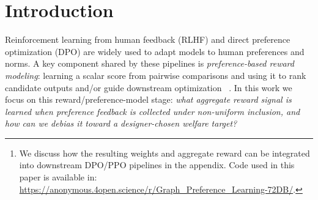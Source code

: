 \documentclass{article}
\theoremstyle{plain}
\theoremstyle{definition}
\theoremstyle{remark}
\begin{document}
\printAffiliationsAndNotice{}  %

\begin{abstract}
Preference-based reward modeling is a core component of RLHF and DPO pipelines.
In practice, the humans providing preference feedback are rarely an i.i.d.\
sample: recruitment and exposure often follow social, institutional, or spatial
structure, inducing non-uniform inclusion probabilities that correlate with
graph centrality. We formalize preference learning with \emph{network-sampled}
annotators and show that identity-agnostic scalar reward modeling implicitly
represents an inclusion-weighted welfare, over-representing structurally central
communities when the inclusion distribution $q$ differs from a designer-chosen
target weighting $\pi$. We propose Graph-Preference Learning, which
combines (i) a graph-personalized reward model that shares statistical strength
across neighboring annotators and (ii) graph-balanced aggregation that computes
stabilized importance weights to target $\pi$. Our analysis characterizes the
induced welfare represented by the learned aggregate reward and bounds its
deviation from the target in terms of weight mismatch, reward-model
approximation, and finite-sample effects. Experiments on synthetic graphs and a
\emph{semi-synthetic} case study on the LMArena preference dataset,
where biased inclusion is \emph{induced} via graph-based sampling, demonstrate up to 62\% reduction in
target-welfare recovery error and 17\% reduction in cross-language performance
gaps under biased inclusion\footnote{We discuss how the resulting weights and aggregate
reward can be integrated into downstream DPO/PPO pipelines in the appendix. Code used in this paper is available in: \url{https://anonymous.4open.science/r/Graph_Preference_Learning-72DB/}.}. 
\end{abstract}

\section{Introduction}
\label{sec:intro}

Reinforcement learning from human feedback (RLHF) and direct preference
optimization (DPO) are widely used to adapt models to human preferences and
norms. A key component shared by these pipelines is \emph{preference-based reward
modeling}: learning a scalar score from pairwise comparisons and using it to
rank candidate outputs and/or guide downstream optimization
~\citep{ouyang2022instructgpt,rafailov2023dpo,kaufmann2025survey,lambert2025rlhfbook}.
In this work we focus on this reward/preference-model stage: \emph{what
aggregate reward signal is learned when preference feedback is collected under
non-uniform inclusion, and how can we debias it toward a designer-chosen welfare
target?}
\end{document}
